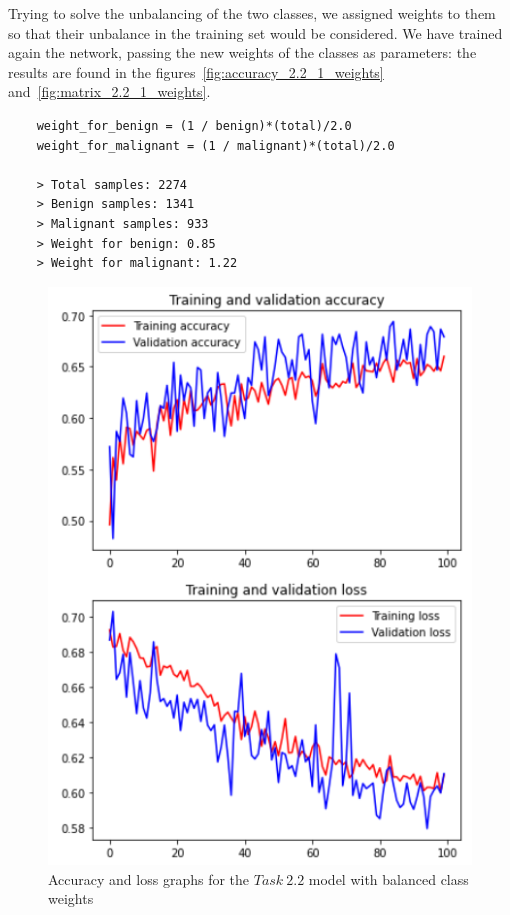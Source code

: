 \documentclass[11pt,a4paper,oneside]{article}
\begin{document}
Trying to solve the unbalancing of the two classes, we assigned weights to them so that their unbalance in the training set would be considered. We have trained again the network, passing the new weights of the classes as parameters: the results are found in the figures~\ref{fig:accuracy_2.2_1_weights} and~\ref{fig:matrix_2.2_1_weights}. 

\begin{verbatim}
    weight_for_benign = (1 / benign)*(total)/2.0 
    weight_for_malignant = (1 / malignant)*(total)/2.0
    
    > Total samples: 2274
    > Benign samples: 1341
    > Malignant samples: 933
    > Weight for benign: 0.85
    > Weight for malignant: 1.22
\end{verbatim}

\begin{figure}[h]
\centering
	\begin{minipage}[c]{.4\textwidth}
		\centering\setlength{\captionmargin}{0pt}%
		\includegraphics[width=.9\textwidth]{images/2.2/7_acc}
		\caption{Accuracy and loss graphs for the $Task\ 2.2$ model with balanced class weights}

\end{minipage}
\end{figure}
\end{document}
